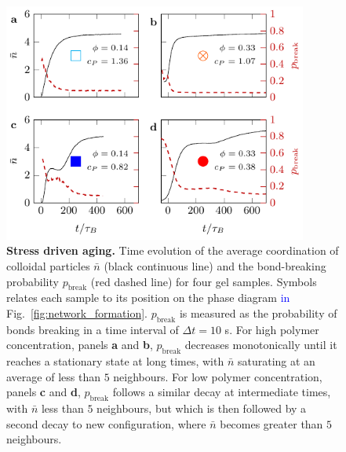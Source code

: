 \documentclass[preprint,amsmath,amssymb,superscriptaddress]{revtex4-1}
\begin{document}
\begin{figure}
 \includegraphics[width=10cm]{bond_breaking.pdf}
 \caption{{\bf Stress driven aging.} Time evolution of the average coordination of colloidal particles $\bar{n}$ (black continuous line) and the bond-breaking probability $p_\text{break}$ (red dashed line) for four gel samples. Symbols relates each sample to its position on the phase diagram \textcolor{blue}{in} Fig.~\ref{fig:network_formation}. $p_\text{break}$ is measured as the probability of bonds breaking in a time interval of $\Delta t=10$ s. For high polymer concentration, panels {\bf a} and {\bf b}, $p_\text{break}$ decreases monotonically until it reaches a stationary state at long times, with $\bar{n}$ saturating at an average of less than $5$ neighbours. For low polymer concentration, panels {\bf c} and {\bf d}, $p_\text{break}$ follows a similar decay at intermediate times, with $\bar{n}$ less than $5$ neighbours, but which is then followed by a second decay to new configuration, where $\bar{n}$ becomes greater than $5$ neighbours.}
 \label{fig:bond_breaking}
\end{figure}
\end{document}
